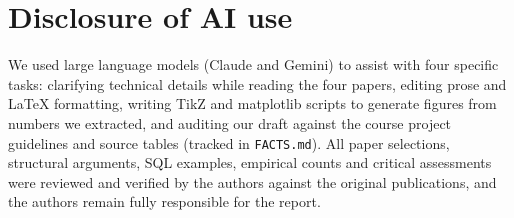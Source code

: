 \section*{Disclosure of AI use}\label{sec:llm}
We used large language models (Claude and Gemini) to assist with four specific tasks: clarifying technical details while reading the four papers, editing prose and \LaTeX{} formatting, writing TikZ and matplotlib scripts to generate figures from numbers we extracted, and auditing our draft against the course project guidelines and source tables (tracked in \texttt{FACTS.md}). All paper selections, structural arguments, SQL examples, empirical counts and critical assessments were reviewed and verified by the authors against the original publications, and the authors remain fully responsible for the report.
